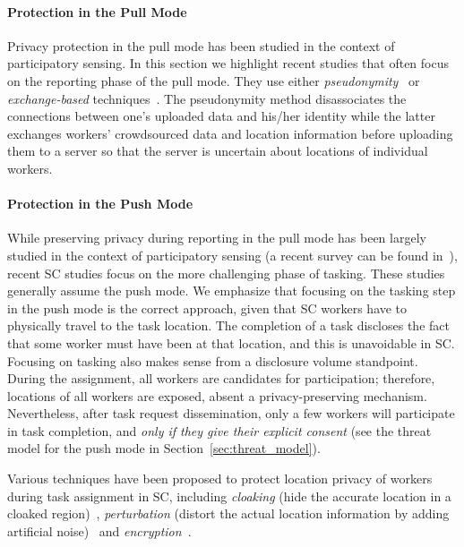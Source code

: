 \documentclass{USC-Thesis}
\numberwithin{equation}{chapter}
\begin{document}
\paragraph{Protection in the Pull Mode}

Privacy protection in the pull mode has been studied in the context of participatory sensing.
In this section we highlight recent studies that often focus on the reporting phase of the pull mode. They use either \emph{pseudonymity}~\cite{Shin2011} or \emph{exchange-based} techniques~\cite{Boutsis2013,Zhang2016}. The pseudonymity method disassociates the connections between one's uploaded data and his/her identity while the latter exchanges workers' crowdsourced data and location information before uploading them to a server so that the server is uncertain about locations of individual workers.

\paragraph{Protection in the Push Mode}
While preserving privacy during reporting in the pull mode has been largely studied in the context of participatory sensing (a recent survey can be found in~\cite{Christin2016a}), recent SC studies focus on the more challenging phase of tasking. These studies generally assume the push mode. 
We emphasize that focusing on the tasking step in the push mode is the correct approach, given that SC workers have to physically travel to the task location. The completion of a task discloses the fact that some worker must have been at that location, and this is unavoidable in SC. 
Focusing on tasking also makes sense from a disclosure volume standpoint. During the assignment, all workers are candidates for participation; therefore, locations of all workers are exposed, absent a privacy-preserving mechanism. Nevertheless, after task request dissemination, only a few workers will participate in task completion, and {\em only if they give their explicit consent} (see the threat model for the push mode in Section~\ref{sec:threat_model}).

Various techniques have been proposed to protect location privacy of workers during task assignment in SC, including \emph{cloaking} (hide the accurate location in a cloaked region)~\cite{kazemi2012geocrowd,Vu2012,pournajaf2014spatial,Hu2015}, \emph{perturbation} (distort the actual location information by adding artificial noise)~\cite{to2014framework,Gong2015,Zhang2015,to2016sc} and \emph{encryption}~\cite{Shin2011,Shen2016}.
\end{document}
